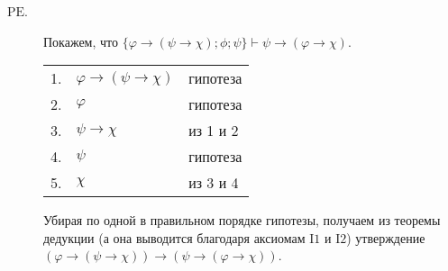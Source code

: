 \documentclass[12pt,a4paper]{article}
\begin{document}
\begin{enumproblem}
\begin{description}
            \item[$\mathrm{PE}$.] Покажем, что $\{\varphi \rightarrow (\psi \rightarrow \chi); \phi; \psi\} \vdash \psi \rightarrow (\varphi \rightarrow \chi)$.
                \begin{center}
                    \begin{tabular}{rll}
                        1.& $\varphi \rightarrow (\psi \rightarrow \chi)$& гипотеза\\
                        2.& $\varphi$& гипотеза\\
                        3.& $\psi \rightarrow \chi$& из 1 и 2\\
                        4.& $\psi$& гипотеза\\
                        5.& $\chi$& из 3 и 4\\
                    \end{tabular}
                \end{center}
                Убирая по одной в правильном порядке гипотезы, получаем из теоремы дедукции (а она выводится благодаря аксиомам $\mathrm{I1}$ и $\mathrm{I2}$) утверждение $(\varphi \rightarrow (\psi \rightarrow \chi)) \rightarrow (\psi \rightarrow (\varphi \rightarrow \chi))$.
        \end{description}
    \end{enumproblem}
\end{document}
